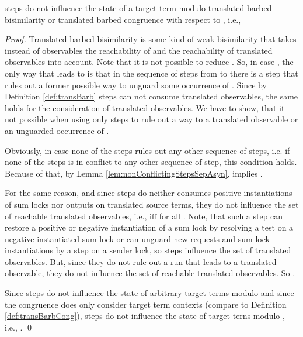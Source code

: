 \documentclass[]{llncs}
\begin{document}
\begin{lemma} \label{lem:pureAdminStepsTransBarbBisimSepAsyn}
	\Pure \admin steps do not influence the state of a target term modulo translated barbed bisimilarity or translated barbed congruence with respect to , i.e.,
	
\end{lemma}

\begin{proof}
	Translated barbed bisimilarity is some kind of weak bisimilarity that takes instead of observables the reachability of  and the reachability of translated observables into account. Note that it is not possible to reduce . So, in case , the only way that leads to  is that in the sequence of steps from  to  there is a step that rules out a former possible way to unguard some occurrence of . Since by Definition \ref{def:transBarb} \pure \admin steps can not consume translated observables, the same holds for the consideration of translated observables. We have to show, that it not possible when using only \pure \admin steps to rule out a way to a translated observable or an unguarded occurrence of .
	
	Obviously, in case none of the \pure \admin steps rules out any other sequence of steps, i.e. if none of the \admin steps is in conflict to any other sequence of step, this condition holds. Because of that, by Lemma \ref{lem:nonConflictingStepsSepAsyn},  implies .
	
	For the same reason, and since \pure \admin steps do neither consumes positive instantiations of sum locks nor outputs on translated source terms, they do not influence the set of reachable translated observables, i.e.,  iff  for all . Note, that such a step can restore a positive or negative instantiation of a sum lock by resolving a test on a negative instantiated sum lock or can unguard new requests and sum lock instantiations by a step on a sender lock, so \pure \admin steps influence the set of translated observables. But, since they do not rule out a run that leads to a translated observable, they do not influence the set of reachable translated observables. So .
	
	Since \pure \admin steps do not influence the state of arbitrary target terms modulo  and since the congruence  does only consider target term contexts (compare to Definition \ref{def:transBarbCong}), \pure \admin steps do not influence the state of target terns modulo , i.e., .
	\qed
\end{proof}
\end{document}
